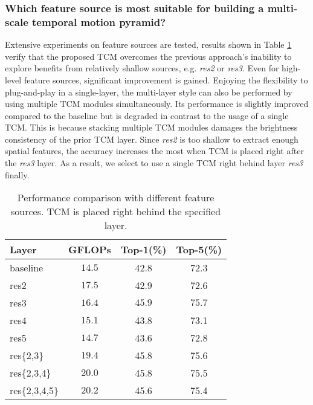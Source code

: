 \documentclass[journal]{IEEEtran}
\begin{document}
\subsubsection{Which feature source is most suitable for building a multi-scale temporal motion pyramid?}
Extensive experiments on feature sources are tested, results shown in Table \ref{tab:featuresource} verify that the proposed TCM overcomes the previous approach's inability to explore benefits from relatively shallow sources, e.g. \textit{res2} or \textit{res3}. Even for high-level feature sources, significant improvement is gained. Enjoying the flexibility to plug-and-play in a single-layer, the multi-layer style can also be performed by using multiple TCM modules simultaneously. Its performance is slightly improved compared to the baseline but is degraded in contrast to the usage of a single TCM. This is because stacking multiple TCM modules damages the brightness consistency of the prior TCM layer. Since \textit{res2} is too shallow to extract enough spatial features, the accuracy increases the most when TCM is placed right after the \textit{res3} layer. As a result, we select to use a single TCM right behind layer \textit{res3} finally.
\begin{table}[!htbp]
\centering
\caption{Performance comparison with different feature sources. TCM is placed right behind the specified layer.}
\label{tab:featuresource}
\begin{tabular}{l|c|c|c}
\hline Layer & GFLOPs & Top-1(\%) & Top-5(\%) \\
\hline baseline & $14.5$ & 42.8 & 72.3 \\ \hline
res2 & $17.5$ & 42.9 & 72.6 \\
res3 & $16.4$ & $\mathbf{45.9}$ & $\mathbf{75.7}$ \\
res4 & $15.1$ & 43.8 & 73.1 \\
res5 & $14.7$ & 43.6 & 72.8 \\
res\{2,3\} & $19.4$ & 45.8 & 75.6 \\
res\{2,3,4\} & $20.0$ & 45.8 & 75.5 \\
res\{2,3,4,5\} & $20.2$ & 45.6 & 75.4 \\
\hline
\end{tabular}
\end{table}
\end{document}
